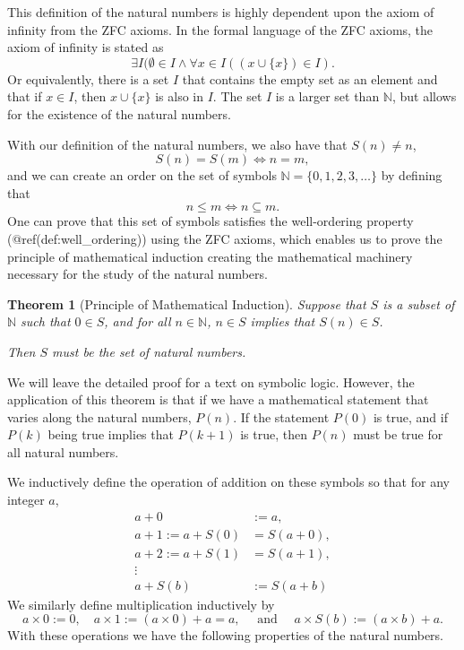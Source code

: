 \documentclass[
]{book}
\newtheorem{theorem}{Theorem}[chapter]
\theoremstyle{definition}
\theoremstyle{definition}
\theoremstyle{definition}
\theoremstyle{remark}
\begin{document}
This definition of the natural numbers is highly dependent upon the axiom of infinity from the ZFC axioms. In the formal language of the ZFC axioms, the axiom of infinity is stated as
\[\exists I ( \emptyset\in I \wedge \forall x\in I((x\cup \{x\})\in I).\] Or equivalently, there is a set \(I\) that contains the empty set as an element and that if \(x\in I\), then \(x\cup \{x\}\) is also in \(I\). The set \(I\) is a larger set than \(\mathbb{N}\), but allows for the existence of the natural numbers.

With our definition of the natural numbers, we also have that \(S(n)\neq n\), \[S(n)=S(m) \Leftrightarrow n=m,\] and we can create an order on the set of symbols \(\mathbb{N} = \{0, 1, 2, 3, \ldots \}\) by defining that
\[n \leq m \Longleftrightarrow n \subseteq m.\] One can prove that this set of symbols satisfies the well-ordering property (@ref(def:well\_ordering)) using the ZFC axioms, which enables us to prove the principle of mathematical induction creating the mathematical machinery necessary for the study of the natural numbers.

\begin{theorem}[Principle of Mathematical Induction]
\protect\hypertarget{thm:unnamed-chunk-49}{}{\label{thm:unnamed-chunk-49} {} }Suppose that \(S\) is a subset of \(\mathbb{N}\) such that \(0\in S\), and for all \(n\in \mathbb{N}\), \(n\in S\) implies that \(S(n) \in S\).

Then \(S\) must be the set of natural numbers.
\end{theorem}

We will leave the detailed proof for a text on symbolic logic. However, the application of this theorem is that if we have a mathematical statement that varies along the natural numbers, \(P(n)\). If the statement \(P(0)\) is true, and if \(P(k)\) being true implies that \(P(k+1)\) is true, then \(P(n)\) must be true for all natural numbers.

We inductively define the operation of addition on these symbols so that for any integer \(a\),
\begin{align*}
    a+0 &:=a, \\
    a+1 := a+S(0) &= S(a+0), \\
    a+2:=a+S(1) &= S(a+1), \\
    \vdots \\
    a+S(b) &:= S(a+b)
\end{align*}
We similarly define multiplication inductively by
\[a\times 0 := 0, \quad a\times 1 := (a \times 0)+a = a, \quad \mbox{ and } \quad a\times S(b) := (a\times b)+a.\]
With these operations we have the following properties of the natural numbers.
\end{document}
